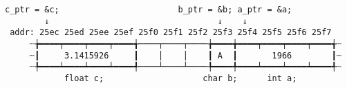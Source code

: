 \documentclass[varwidth=30cm,crop]{standalone}
\begin{document}
\begin{verbatim}
c_ptr = &c;                        b_ptr = &b; a_ptr = &a;
        ↓                                  ↓    ↓
 addr: 25ec 25ed 25ee 25ef 25f0 25f1 25f2 25f3 25f4 25f5 25f6 25f7
     ┈╆━━━━┯━━━━┯━━━━┯━━━━╅────┬────┬────╆━━━━╈━━━━┯━━━━┯━━━━┯━━━━╅┈
     ┈┃     3.1415926     ┃    │    │    ┃ A  ┃       1966        ┃┈
     ┈╄━━━━┷━━━━┷━━━━┷━━━━╃────┴────┴────╄━━━━╇━━━━┷━━━━┷━━━━┷━━━━╃┈
            float c;                    char b;      int a;
\end{verbatim}
\end{document}
